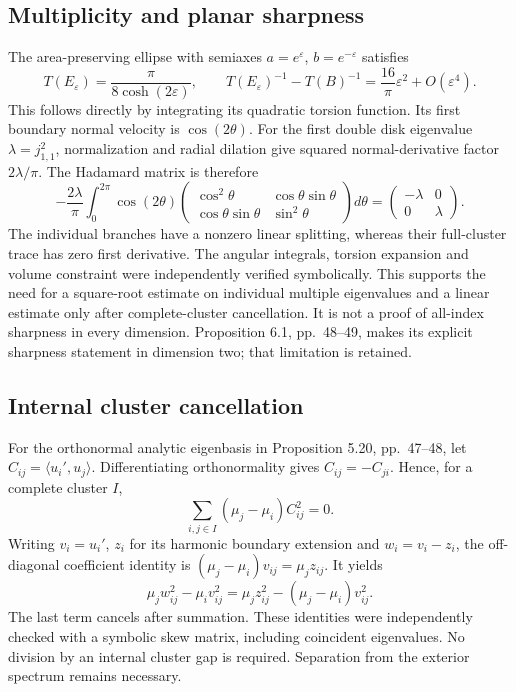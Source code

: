 \documentclass[10pt]{article}
\begin{document}
\subsection*{Multiplicity and planar sharpness}
The area-preserving ellipse with semiaxes \(a=e^\varepsilon\), \(b=e^{-\varepsilon}\) satisfies \[T(E_\varepsilon)=\frac{\pi}{8\cosh(2\varepsilon)},\qquad
 T(E_\varepsilon)^{-1}-T(B)^{-1}
 =\frac{16}{\pi}\varepsilon^2+O(\varepsilon^4).\] This follows directly by integrating its quadratic torsion function. Its first boundary normal velocity is \(\cos(2\theta)\). For the first double disk eigenvalue \(\lambda=j_{1,1}^2\), normalization and radial dilation give squared normal-derivative factor \(2\lambda/\pi\). The Hadamard matrix is therefore \[-\frac{2\lambda}{\pi}\int_0^{2\pi}\cos(2\theta)
 \begin{pmatrix}
 \cos^2\theta&\cos\theta\sin\theta\\
 \cos\theta\sin\theta&\sin^2\theta
 \end{pmatrix}d\theta
 =
 \begin{pmatrix}-\lambda&0\\0&\lambda\end{pmatrix}.\] The individual branches have a nonzero linear splitting, whereas their full-cluster trace has zero first derivative. The angular integrals, torsion expansion and volume constraint were independently verified symbolically. This supports the need for a square-root estimate on individual multiple eigenvalues and a linear estimate only after complete-cluster cancellation. It is not a proof of all-index sharpness in every dimension. Proposition 6.1, pp. 48–49, makes its explicit sharpness statement in dimension two; that limitation is retained.\par
\subsection*{Internal cluster cancellation}
For the orthonormal analytic eigenbasis in Proposition 5.20, pp. 47–48, let \(C_{ij}=\langle u_i',u_j\rangle\). Differentiating orthonormality gives \(C_{ij}=-C_{ji}\). Hence, for a complete cluster \(I\), \[\sum_{i,j\in I}(\mu_j-\mu_i)C_{ij}^2=0.\] Writing \(v_i=u_i'\), \(z_i\) for its harmonic boundary extension and \(w_i=v_i-z_i\), the off-diagonal coefficient identity is \((\mu_j-\mu_i)v_{ij}=\mu_jz_{ij}\). It yields \[\mu_jw_{ij}^2-\mu_iv_{ij}^2
 =\mu_jz_{ij}^2-(\mu_j-\mu_i)v_{ij}^2.\] The last term cancels after summation. These identities were independently checked with a symbolic skew matrix, including coincident eigenvalues. No division by an internal cluster gap is required. Separation from the exterior spectrum remains necessary.\par
\end{document}
